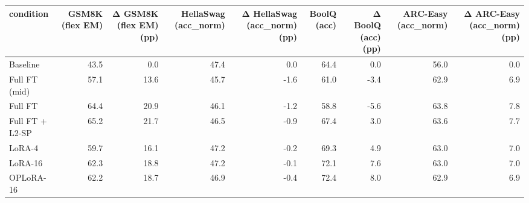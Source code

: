 \begin{tabular}{lrrrrrrrr}
\toprule
condition & GSM8K (flex EM) & Δ GSM8K (flex EM) (pp) & HellaSwag (acc_norm) & Δ HellaSwag (acc_norm) (pp) & BoolQ (acc) & Δ BoolQ (acc) (pp) & ARC-Easy (acc_norm) & Δ ARC-Easy (acc_norm) (pp) \\
\midrule
Baseline & 43.5 & 0.0 & 47.4 & 0.0 & 64.4 & 0.0 & 56.0 & 0.0 \\
Full FT (mid) & 57.1 & 13.6 & 45.7 & -1.6 & 61.0 & -3.4 & 62.9 & 6.9 \\
Full FT & 64.4 & 20.9 & 46.1 & -1.2 & 58.8 & -5.6 & 63.8 & 7.8 \\
Full FT + L2-SP & 65.2 & 21.7 & 46.5 & -0.9 & 67.4 & 3.0 & 63.6 & 7.7 \\
LoRA-4 & 59.7 & 16.1 & 47.2 & -0.2 & 69.3 & 4.9 & 63.0 & 7.0 \\
LoRA-16 & 62.3 & 18.8 & 47.2 & -0.1 & 72.1 & 7.6 & 63.0 & 7.0 \\
OPLoRA-16 & 62.2 & 18.7 & 46.9 & -0.4 & 72.4 & 8.0 & 62.9 & 6.9 \\
\bottomrule
\end{tabular}
